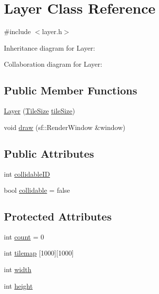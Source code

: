 \hypertarget{classLayer}{}\section{Layer Class Reference}
\label{classLayer}


{\ttfamily \#include $<$layer.\+h$>$}



Inheritance diagram for Layer\+:


Collaboration diagram for Layer\+:
\subsection*{Public Member Functions}
\begin{DoxyCompactItemize}
\item 
\hyperlink{classLayer_a4643db0682665b8f8de285e2e5ed3cb2}{Layer} (\hyperlink{structTileSize}{Tile\+Size} \hyperlink{classObject_a40a932c0593ca2687eebc518b2c84c71}{tile\+Size})
\item 
void \hyperlink{classLayer_a0b53da5d6f0358bcda1470fc0193c2ce}{draw} (sf\+::\+Render\+Window \&window)
\end{DoxyCompactItemize}
\subsection*{Public Attributes}
\begin{DoxyCompactItemize}
\item 
int \hyperlink{classLayer_ac84dc3efe941817d099a158ab0da7ebd}{collidable\+ID}
\item 
bool \hyperlink{classLayer_a1ccf349686f89af692c7a4f4087ce279}{collidable} = false
\end{DoxyCompactItemize}
\subsection*{Protected Attributes}
\begin{DoxyCompactItemize}
\item 
int \hyperlink{classLayer_a2d61e86f27d4c5c43224281ec9fd6357}{count} = 0
\item 
int \hyperlink{classLayer_a45c20f94cdebe331b0af278f1f127bab}{tilemap} \mbox{[}1000\mbox{]}\mbox{[}1000\mbox{]}
\item 
int \hyperlink{classLayer_a724d3020ddbe5f9280caa325541e70a3}{width}
\item 
int \hyperlink{classLayer_a6a0bc24033339368a0ca9747485f0053}{height}
\end{DoxyCompactItemize}
